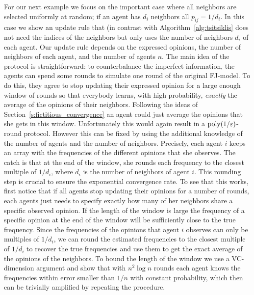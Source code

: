 For our next example we focus on the important case where all neighbors
are selected uniformly at random; if an agent has $d_i$ neighbors
all $p_{ij} = 1/d_i$.  In this case we show an update rule that (in contrast
with Algorithm~\ref{alg:tsitsiklis} does not need the indices of the neighbors
but only uses the number of neighbors $d_i$ of each agent.
Our update rule depends on the expressed opinions, the number of neighbors of
each agent, and the number of agents $n$.
The main idea of the protocol is straightforward: to counterbalance the
imperfect information, the agents can spend some rounds to simulate one round
of the original FJ-model. To do this, they agree to stop updating their
expressed opinion for a large enough window of rounds so that everybody learns,
with high probability, \emph{exactly} the average of the opinions of their
neighbors.  Following the ideas of Section~\ref{s:fictitious_convergence} an
agent could just average the opinions that she gets in this window.
Unfortunately this would again result in a $\mathrm{poly}(1/\varepsilon)$-round protocol.
However this can be fixed by using the additional knowledge of the number
of agents and the number of neighbors. Precisely, each agent
$i$ keeps an array with the frequencies of the different opinions that she
observes. The catch is that at the end of the window, she rounds each frequency
to the closest multiple of $1/d_i$, where $d_i$ is the number of neighbors of
agent $i$. This rounding step is crucial to ensure the exponential convergence
rate. To see that this works, first notice that if all agents stop updating
their opinions for a number of rounds, each agents just needs to specify
exactly how many of her neighbors share a specific observed opinion.
If the length of the window is large the frequency of
a specific opinion at the end of the window will be sufficiently
close to the true frequency.  Since the frequencies of
the opinions that agent $i$ observes can only be multiples of $1/d_i$,
we can round the estimated frequencies to the closest multiple of $1/d_i$ to
recover the true frequencies and use them to get the exact average of the
opinions of the neighbors.  To bound the length of the window we use a
VC-dimension argument and show that with $n^2 \log n$ rounds each agent
knows the frequencies within error smaller than $1/n$ with constant
probability, which then can be trivially amplified by repeating the procedure.


